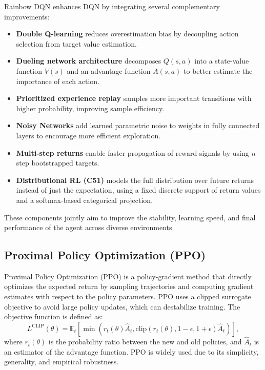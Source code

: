 \documentclass{article}
\begin{document}
Rainbow DQN \cite{hessel2018rainbow} enhances DQN by integrating several complementary improvements:
\begin{itemize}
    \item \textbf{Double Q-learning} reduces overestimation bias by decoupling action selection from target value estimation.
    \item \textbf{Dueling network architecture} decomposes $Q(s, a)$ into a state-value function $V(s)$ and an advantage function $A(s, a)$ to better estimate the importance of each action.
    \item \textbf{Prioritized experience replay} samples more important transitions with higher probability, improving sample efficiency.
    \item \textbf{Noisy Networks} add learned parametric noise to weights in fully connected layers to encourage more efficient exploration.
    \item \textbf{Multi-step returns} enable faster propagation of reward signals by using $n$-step bootstrapped targets.
    \item \textbf{Distributional RL (C51)} models the full distribution over future returns instead of just the expectation, using a fixed discrete support of return values and a softmax-based categorical projection.
\end{itemize}

These components jointly aim to improve the stability, learning speed, and final performance of the agent across diverse environments.

\subsection{Proximal Policy Optimization (PPO)}

Proximal Policy Optimization (PPO) \cite{schulman2017proximal} is a policy-gradient method that directly optimizes the expected return by sampling trajectories and computing gradient estimates with respect to the policy parameters. PPO uses a clipped surrogate objective to avoid large policy updates, which can destabilize training. The objective function is defined as:
\[
L^{\text{CLIP}}(\theta) = \mathbb{E}_t \left[ \min \left( r_t(\theta) \hat{A}_t, \text{clip}(r_t(\theta), 1 - \epsilon, 1 + \epsilon) \hat{A}_t \right) \right],
\]
where $r_t(\theta)$ is the probability ratio between the new and old policies, and $\hat{A}_t$ is an estimator of the advantage function. PPO is widely used due to its simplicity, generality, and empirical robustness.
\end{document}

